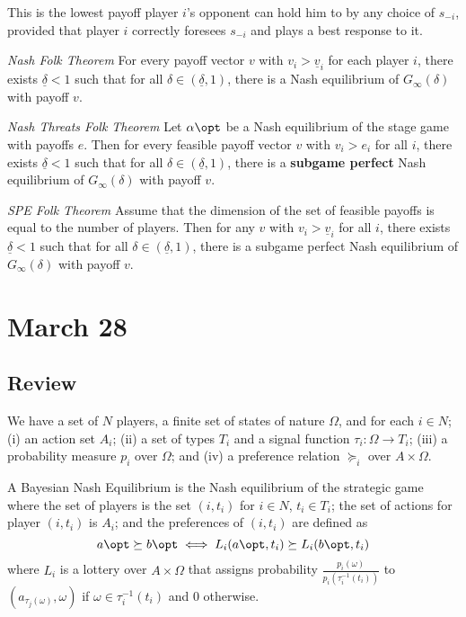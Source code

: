 \documentclass[10pt]{article}
\begin{document}
\begin{remark}
	This is the lowest payoff player $i$'s opponent can hold him to by any choice of $s_{-i}$, provided that player $i$ correctly foresees $s_{-i}$ and plays a best response to it.
\end{remark}
\begin{theorem}
	\emph{Nash Folk Theorem} For every payoff vector $v$ with $v_i > \underline{v}_i$ for each player $i$, there exists $\underline{\delta}<1$ such that for all $\delta \in (\underline{\delta},1)$, there is a Nash equilibrium of $G_\infty(\delta)$ with payoff $v$.
\end{theorem}
\begin{theorem}
	\emph{Nash Threats Folk Theorem} Let $\alpha\opt$ be a Nash equilibrium of the stage game with payoffs $e$. Then for every feasible payoff vector $v$ with $v_i > e_i$ for all $i$, there exists $\underline{\delta}<1$ such that for all $\delta \in (\underline{\delta},1)$, there is a \textbf{subgame perfect} Nash equilibrium of $G_\infty(\delta)$ with payoff $v$.
\end{theorem}
\begin{theorem}
	\emph{SPE Folk Theorem} Assume that the dimension of the set of feasible payoffs is equal to the number of players. Then for any $v$ with $v_i > \underline{v}_i$ for all $i$, there exists $\underline{\delta} < 1$ such that for all $\delta \in (\underline{\delta},1)$, there is a subgame perfect Nash equilibrium of $G_\infty(\delta)$ with payoff $v$.
\end{theorem}



\section{March 28}

\subsection{Review}

\begin{definition}
	We have a set of $N$ players, a finite set of states of nature $\Omega$, and for each $i \in N$; (i) an action set $A_i$; (ii) a set of types $T_i$ and a signal function $\tau_i: \Omega \to T_i$; (iii) a probability measure $p_i$ over $\Omega$; and (iv) a preference relation $\succeq_i$ over $A \times \Omega$.
\end{definition}

\begin{definition}
	A Bayesian Nash Equilibrium is the Nash equilibrium of the strategic game where the set of players is the set $(i,t_i)$ for $i \in N$, $t_i \in T_i$; the set of actions for player $(i,t_i)$ is $A_i$; and the preferences of $(i,t_i)$ are defined as \[a\opt \succeq b\opt \iff L_i(a\opt,t_i) \succeq L_i(b\opt,t_i)\]where $L_i$ is a lottery over $A \times \Omega$ that assigns probability $\frac{p_i(\omega)}{p_i(\tau_i^{-1}(t_i))}$ to $(a_{\tau_j(\omega)},\omega)$ if $\omega \in \tau_i^{-1}(t_i)$ and 0 otherwise.
\end{definition}
\end{document}

